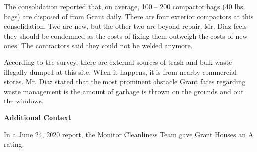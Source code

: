 The consolidation reported that, on average, 100 -- 200 compactor bags (40 lbs. bags)  are disposed of from Grant daily. There are four exterior compactors at this consolidation. Two are new, but the other two are beyond repair. Mr. Diaz feels they should be condemned as the costs of fixing them outweigh the costs of new ones. The contractors said they could not be welded anymore.

According to the survey, there are external sources of trash and bulk waste illegally dumped at this site. When it happens, it is from nearby commercial stores. Mr. Diaz stated that the most prominent obstacle Grant faces regarding waste management is the amount of garbage is thrown on the grounds and out the windows.  

\textbf{Additional Context} 

In a June 24, 2020 report, the Monitor Cleanliness Team gave Grant Houses an A rating. 